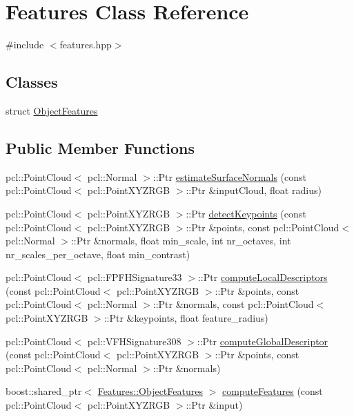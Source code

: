 \hypertarget{class_features}{}\section{Features Class Reference}
\label{class_features}


{\ttfamily \#include $<$features.\+hpp$>$}

\subsection*{Classes}
\begin{DoxyCompactItemize}
\item 
struct \hyperlink{struct_features_1_1_object_features}{Object\+Features}
\end{DoxyCompactItemize}
\subsection*{Public Member Functions}
\begin{DoxyCompactItemize}
\item 
pcl\+::\+Point\+Cloud$<$ pcl\+::\+Normal $>$\+::Ptr \hyperlink{class_features_a925cf73afb0607d0fe74a47347ec670d}{estimate\+Surface\+Normals} (const pcl\+::\+Point\+Cloud$<$ pcl\+::\+Point\+X\+Y\+Z\+R\+GB $>$\+::Ptr \&input\+Cloud, float radius)
\item 
pcl\+::\+Point\+Cloud$<$ pcl\+::\+Point\+X\+Y\+Z\+R\+GB $>$\+::Ptr \hyperlink{class_features_a5c6f5430e675a9216da80875e700f32e}{detect\+Keypoints} (const pcl\+::\+Point\+Cloud$<$ pcl\+::\+Point\+X\+Y\+Z\+R\+GB $>$\+::Ptr \&points, const pcl\+::\+Point\+Cloud$<$ pcl\+::\+Normal $>$\+::Ptr \&normals, float min\+\_\+scale, int nr\+\_\+octaves, int nr\+\_\+scales\+\_\+per\+\_\+octave, float min\+\_\+contrast)
\item 
pcl\+::\+Point\+Cloud$<$ pcl\+::\+F\+P\+F\+H\+Signature33 $>$\+::Ptr \hyperlink{class_features_a9a35a8508f21553be97a868a167ac2de}{compute\+Local\+Descriptors} (const pcl\+::\+Point\+Cloud$<$ pcl\+::\+Point\+X\+Y\+Z\+R\+GB $>$\+::Ptr \&points, const pcl\+::\+Point\+Cloud$<$ pcl\+::\+Normal $>$\+::Ptr \&normals, const pcl\+::\+Point\+Cloud$<$ pcl\+::\+Point\+X\+Y\+Z\+R\+GB $>$\+::Ptr \&keypoints, float feature\+\_\+radius)
\item 
pcl\+::\+Point\+Cloud$<$ pcl\+::\+V\+F\+H\+Signature308 $>$\+::Ptr \hyperlink{class_features_a6e7efba994adbfa03682e796ed932a99}{compute\+Global\+Descriptor} (const pcl\+::\+Point\+Cloud$<$ pcl\+::\+Point\+X\+Y\+Z\+R\+GB $>$\+::Ptr \&points, const pcl\+::\+Point\+Cloud$<$ pcl\+::\+Normal $>$\+::Ptr \&normals)
\item 
boost\+::shared\+\_\+ptr$<$ \hyperlink{struct_features_1_1_object_features}{Features\+::\+Object\+Features} $>$ \hyperlink{class_features_ad1d4524155b37393ae8b64f0c5c0d553}{compute\+Features} (const pcl\+::\+Point\+Cloud$<$ pcl\+::\+Point\+X\+Y\+Z\+R\+GB $>$\+::Ptr \&input)
\end{DoxyCompactItemize}


